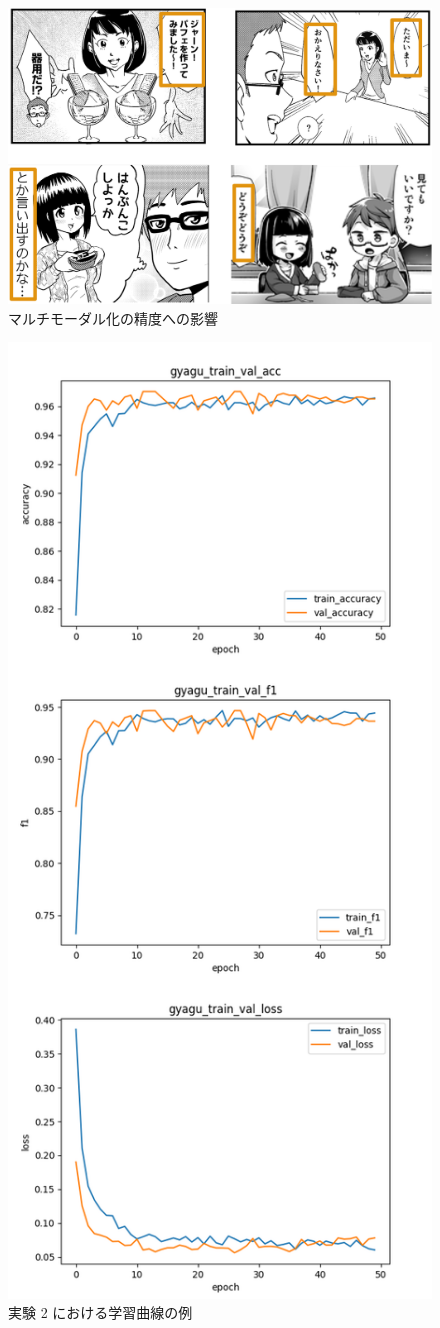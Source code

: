 \begin{figure}[!h]
  \centering
  \includegraphics[width=0.56\hsize]{doc/figures/multimodal_add_seikai.png}
  \caption{マルチモーダル化の精度への影響}
  \label{fig:multimodal_add_seikai}
\end{figure}

\newpage

\begin{figure}[!h]
  \centering
  \includegraphics[width=0.5\hsize]{doc/figures/ex2_graph_hotto_gyagu_big.png}
  \caption{実験 2 における学習曲線の例}
  \label{fig:ex2_graph}
\end{figure}




